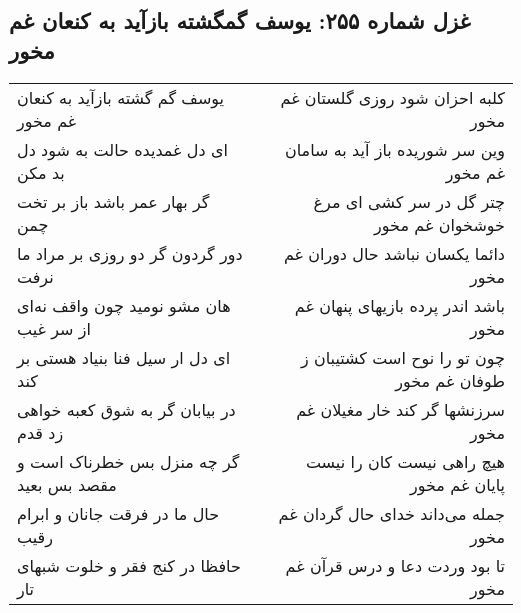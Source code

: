 \begin{center}
\section*{غزل شماره ۲۵۵: یوسف گمگشته بازآید به کنعان غم مخور}
\label{sec:sh255}
\begin{longtable}{l p{0.5cm} r}
یوسف گم گشته بازآید به کنعان غم مخور
&&
کلبه احزان شود روزی گلستان غم مخور
\\
ای دل غمدیده حالت به شود دل بد مکن
&&
وین سر شوریده باز آید به سامان غم مخور
\\
گر بهار عمر باشد باز بر تخت چمن
&&
چتر گل در سر کشی ای مرغ خوشخوان غم مخور
\\
دور گردون گر دو روزی بر مراد ما نرفت 
&&
دائما یکسان نباشد حال دوران غم مخور
\\
هان مشو نومید چون واقف نه‌ای از سر غیب
&&
باشد اندر پرده بازیهای پنهان غم مخور
\\
ای دل ار سیل فنا بنیاد هستی بر کند
&&
چون تو را نوح است کشتیبان ز طوفان غم مخور
\\
در بیابان گر به شوق کعبه خواهی زد قدم
&&
سرزنشها گر کند خار مغیلان غم مخور
\\
گر چه منزل بس خطرناک است و مقصد بس بعید
&&
هیچ راهی نیست کان را نیست پایان غم مخور
\\
حال ما در فرقت جانان و ابرام رقیب
&&
جمله می‌داند خدای حال گردان غم مخور
\\
حافظا در کنج فقر و خلوت شبهای تار
&&
تا بود وردت دعا و درس قرآن غم مخور
\\
\end{longtable}
\end{center}
